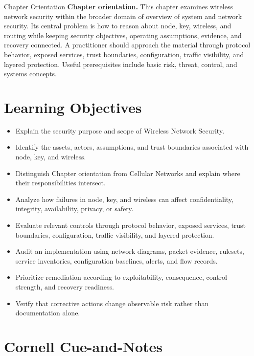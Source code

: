 \documentclass[11pt,letterpaper]{article}
\title{\CornellDocumentTitle}
\author{}
\date{}
\begin{document}
\maketitle
\begin{CornellOverviewBox}{Chapter Orientation}
\textbf{Chapter orientation.} This chapter examines wireless network security within the broader domain of overview of system and network security. Its central problem is how to reason about node, key, wireless, and routing while keeping security objectives, operating assumptions, evidence, and recovery connected. A practitioner should approach the material through protocol behavior, exposed services, trust boundaries, configuration, traffic visibility, and layered protection. Useful prerequisites include basic risk, threat, control, and systems concepts.
\end{CornellOverviewBox}
\section*{Learning Objectives}
\begin{itemize}
\item Explain the security purpose and scope of Wireless Network Security.
\item Identify the assets, actors, assumptions, and trust boundaries associated with node, key, and wireless.
\item Distinguish Chapter orientation from Cellular Networks and explain where their responsibilities intersect.
\item Analyze how failures in node, key, and wireless can affect confidentiality, integrity, availability, privacy, or safety.
\item Evaluate relevant controls through protocol behavior, exposed services, trust boundaries, configuration, traffic visibility, and layered protection.
\item Audit an implementation using network diagrams, packet evidence, rulesets, service inventories, configuration baselines, alerts, and flow records.
\item Prioritize remediation according to exploitability, consequence, control strength, and recovery readiness.
\item Verify that corrective actions change observable risk rather than documentation alone.
\end{itemize}
\section*{Cornell Cue-and-Notes}
\end{document}
